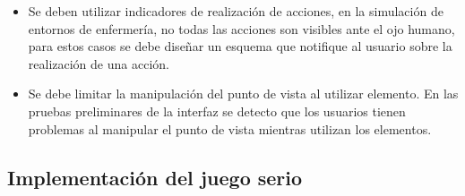 \begin{itemize}
\item Se deben utilizar indicadores de realización de acciones, en la simulación
    de entornos de enfermería, no todas las acciones son visibles ante el ojo
    humano, para estos casos se debe diseñar un esquema que notifique al usuario
    sobre la realización de una acción.
    
\item Se debe limitar la manipulación del punto de vista al utilizar elemento. 
	En las pruebas preliminares de la interfaz se
    detecto que los usuarios tienen problemas al manipular el punto de vista
    mientras utilizan los elementos.

\end{itemize}

\subsection{Implementación del juego serio}


